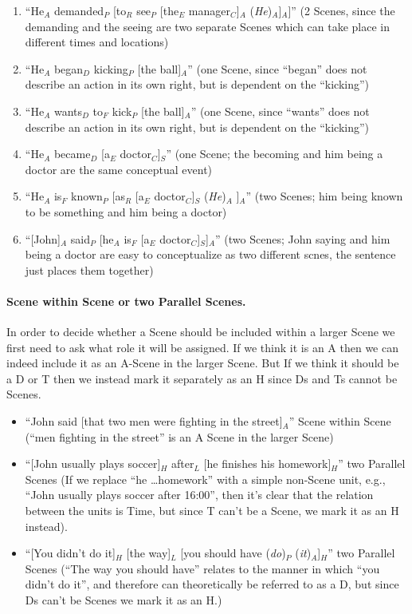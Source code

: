 \documentclass[11pt]{article}
\newcommand{\be}{\begin{enumerate}}
\newcommand{\ee}{\end{enumerate}}
\newcommand{\dd}[1]{{\color{blue}{#1}}}
\newcommand{\rem}[1]{{(\it #1})}
\begin{document}
\be
\item
``He$_A$ demanded$_P$ [to$_R$ see$_P$ [the$_E$ manager$_C$]$_A$ \rem{He}$_A$]$_A$]'' (2 Scenes, since the demanding and the seeing are two separate Scenes which can take place in different times and locations)
\item
``He$_A$ began$_D$ kicking$_P$ [the ball]$_A$'' (one Scene, since ``began'' does not describe an action in its own right, but is dependent on the ``kicking'')
\item
``He$_A$ wants$_D$ to$_F$ kick$_P$ [the ball]$_A$'' (one Scene, since ``wants'' does not describe an action in its own right, but is dependent on the ``kicking'')
\item
  ``He$_A$ became$_D$ [a$_E$ doctor$_C$]$_S$'' (one Scene; the becoming and him being a doctor are the same conceptual event)
\item
``He$_A$ is$_F$ known$_P$ [as$_R$ [a$_E$ doctor$_C$]$_S$ \rem{He}$_A$ ]$_A$'' (two Scenes; him being known to be something and him being a doctor)

\item
  ``[John]$_A$ said$_P$ [he$_A$ is$_F$ [a$_E$ doctor$_C$]$_S$]$_A$'' (two Scenes; John saying and him being a doctor are easy to conceptualize as two different scnes, the sentence just places them together)
 
\ee

\paragraph {Scene within Scene or two Parallel Scenes.} In order to decide whether a Scene should be included within a larger Scene we first need to ask what role it will be assigned.
If we think it is an A then we can indeed include it as an A-Scene in the larger Scene. But If we think it should be a D or T then we instead mark it separately as an H since Ds and Ts cannot be Scenes. 

\begin {itemize}
\item 
``John said [that two men were  fighting in the street]$_A$'' Scene within Scene  (``men fighting in the street'' is an A Scene in the larger Scene)
\item 
``[John usually plays soccer]$_H$ after$_L$ [he finishes his homework]$_H$'' two Parallel Scenes (If we replace ``he \ldots homework'' with a simple non-Scene unit, e.g., ``John usually plays soccer after 16:00'', then it's clear that the relation between the units is Time, but since T can't be a Scene, we mark it as an H instead).
\item 
``[You didn't do it]$_H$ [the way]$_L$ [you should have \rem{do}$_P$ \rem{it}$_A$]$_H$'' two Parallel Scenes
(``The way you should have'' relates to the manner in which ``you didn't do it'', and therefore can theoretically be referred to as a D, but since Ds can't be Scenes we mark it as an H.)
\end {itemize}
\end{document}
